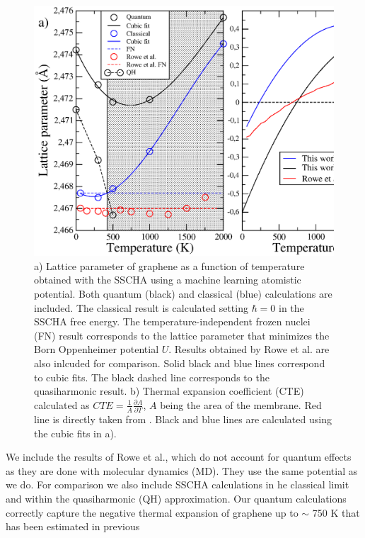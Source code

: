 \begin{figure}[ht]
\includegraphics[width=0.99\linewidth]{Figures/lattice.eps}
\caption[Lattice parameter of graphene as a function of temperature]{a) Lattice parameter of graphene as a function 
	of temperature obtained with the SSCHA using a machine learning atomistic potential. Both quantum (black) and 
	classical (blue) calculations are included. The classical result is calculated setting $\hbar=0$ in the SSCHA 
	free energy. The temperature-independent frozen nuclei (FN) result corresponds to the lattice parameter that 
	minimizes the Born Oppenheimer potential $U$. Results obtained by Rowe et al.\cite{rowe2018development} are 
	also inlcuded for comparison. Solid black and blue lines correspond to cubic fits. The black dashed line 
	corresponds to the quasiharmonic result. b) Thermal expansion coefficient (CTE) calculated as 
	$CTE=\frac{1}{A}\frac{\partial A}{\partial T}$, $A$ being the area of the membrane. Red line is directly 
	taken from \cite{rowe2018development}. Black and blue lines are calculated using the cubic fits in a).}
\label{lattice}
\end{figure}
We include the results of Rowe et al.\cite{rowe2018development}, which do not account for quantum effects as they 
are done with molecular dynamics (MD). They use the same potential as we do. For comparison we also include SSCHA 
calculations in he classical limit and within the quasiharmonic (QH) approximation. Our quantum calculations 
correctly capture the negative thermal expansion of graphene up to $\sim$ 750 K that has been estimated in previous 
